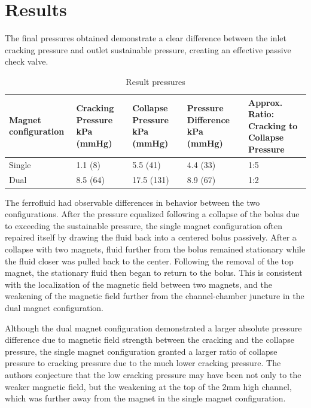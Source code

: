 \documentclass{asme2ej}
\begin{document}
\section{Results}
The final pressures obtained demonstrate a clear difference between
the inlet cracking pressure and outlet sustainable pressure, creating
an effective passive check valve.

\begin{table}[t]
\footnotesize
\caption{Result pressures}
\begin{center}
\label{table_ASME}
\begin{tabular}{|p{0.3in} |p{0.4in} |p{0.49in} |p{0.45in} |p{0.6in} |}
\hline
Magnet configuration &
Cracking Pressure kPa  (mmHg) &
Collapse Pressure kPa  (mmHg) &
Pressure Difference kPa  (mmHg) &
Approx. Ratio: Cracking to Collapse Pressure \\
\hline
Single &
1.1 (8) &
5.5 (41) &
4.4 (33) &
1:5 \\
\hline
Dual &
8.5 (64) &
17.5 (131)&
8.9 (67)&
1:2 \\
\hline
\end{tabular}
\end{center}
\end{table}


The ferrofluid had observable differences in behavior between the two
configurations.  After the pressure equalized
following a collapse of the bolus due to
exceeding the sustainable pressure, the single magnet
configuration often repaired itself by drawing the fluid back
into a centered bolus passively.
After a collapse with two magnets, fluid further from the bolus
remained stationary while the fluid closer was pulled back to the
center. Following the removal of the top magnet, the stationary fluid
then began to return to the bolus. This is consistent with the
localization of the magnetic field between two magnets, and the
weakening of the magnetic field further from the channel-chamber
juncture in the dual magnet configuration.

Although the dual magnet configuration demonstrated a larger absolute
pressure difference due to magnetic field strength between the
cracking and the collapse pressure, the single magnet configuration
granted a larger ratio of collapse pressure to cracking
pressure due to the much lower cracking pressure.
The authors conjecture that the low cracking pressure may have
been not only to the weaker magnetic field, but the weakening at the
top of the 2mm high channel, which was further away from the magnet
in the single magnet configuration.
\end{document}
